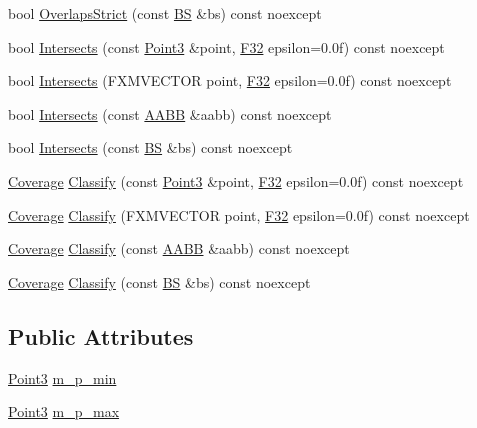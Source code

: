 \begin{DoxyCompactItemize}
\item 
bool \hyperlink{structmage_1_1_a_a_b_b_ac2f7270ec51acb91aed4965f135a53a9}{Overlaps\+Strict} (const \hyperlink{structmage_1_1_b_s}{BS} \&bs) const noexcept
\item 
bool \hyperlink{structmage_1_1_a_a_b_b_a09bae994f8a68a15610b3ed9b73ae2aa}{Intersects} (const \hyperlink{structmage_1_1_point3}{Point3} \&point, \hyperlink{namespacemage_aa97e833b45f06d60a0a9c4fc22ae02c0}{F32} epsilon=0.\+0f) const noexcept
\item 
bool \hyperlink{structmage_1_1_a_a_b_b_ab0e611b5e3be263dd5a1f2a0bef9d13a}{Intersects} (F\+X\+M\+V\+E\+C\+T\+OR point, \hyperlink{namespacemage_aa97e833b45f06d60a0a9c4fc22ae02c0}{F32} epsilon=0.\+0f) const noexcept
\item 
bool \hyperlink{structmage_1_1_a_a_b_b_a9c776b78b3125957bafc9ee99f7eedee}{Intersects} (const \hyperlink{structmage_1_1_a_a_b_b}{A\+A\+BB} \&aabb) const noexcept
\item 
bool \hyperlink{structmage_1_1_a_a_b_b_ac51fa4b4d3100d587c6a2d2b5513ad88}{Intersects} (const \hyperlink{structmage_1_1_b_s}{BS} \&bs) const noexcept
\item 
\hyperlink{namespacemage_aa9fe157e5a578a103160266df8cccb0a}{Coverage} \hyperlink{structmage_1_1_a_a_b_b_a4397eb9619f0c414dcb11819196784ed}{Classify} (const \hyperlink{structmage_1_1_point3}{Point3} \&point, \hyperlink{namespacemage_aa97e833b45f06d60a0a9c4fc22ae02c0}{F32} epsilon=0.\+0f) const noexcept
\item 
\hyperlink{namespacemage_aa9fe157e5a578a103160266df8cccb0a}{Coverage} \hyperlink{structmage_1_1_a_a_b_b_ab6661d8d10ef7327c65bd9dfb3eabda6}{Classify} (F\+X\+M\+V\+E\+C\+T\+OR point, \hyperlink{namespacemage_aa97e833b45f06d60a0a9c4fc22ae02c0}{F32} epsilon=0.\+0f) const noexcept
\item 
\hyperlink{namespacemage_aa9fe157e5a578a103160266df8cccb0a}{Coverage} \hyperlink{structmage_1_1_a_a_b_b_a835279b552703bd72fa19856ad27cbd7}{Classify} (const \hyperlink{structmage_1_1_a_a_b_b}{A\+A\+BB} \&aabb) const noexcept
\item 
\hyperlink{namespacemage_aa9fe157e5a578a103160266df8cccb0a}{Coverage} \hyperlink{structmage_1_1_a_a_b_b_a3092e0f6765695222f78bcfd78d67a6b}{Classify} (const \hyperlink{structmage_1_1_b_s}{BS} \&bs) const noexcept
\end{DoxyCompactItemize}
\subsection*{Public Attributes}
\begin{DoxyCompactItemize}
\item 
\hyperlink{structmage_1_1_point3}{Point3} \hyperlink{structmage_1_1_a_a_b_b_af5b7608aa0e332d70edfe0cb77bd27c2}{m\+\_\+p\+\_\+min}
\item 
\hyperlink{structmage_1_1_point3}{Point3} \hyperlink{structmage_1_1_a_a_b_b_a51643192d891301df8d8d3f24abd2a27}{m\+\_\+p\+\_\+max}
\end{DoxyCompactItemize}


